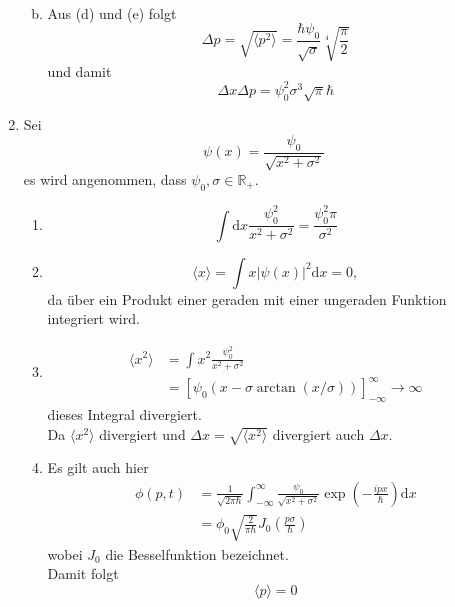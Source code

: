 \begin{enumerate}
\begin{enumerate}[(a)]
\begin{align}
\end{align}
\item Aus (d) und (e) folgt
\begin{equation}
  \Delta p = \sqrt{\langle p^2 \rangle} = \frac{\hbar \psi_0} {\sqrt{\sigma}}\sqrt[4]{\frac{\pi}{2}}
\end{equation}
und damit 
\begin{equation}
  \Delta x \Delta p = \psi_0^2\sigma^3\sqrt{\pi}\hbar
\end{equation}
\end{enumerate}
\item Sei 
\begin{equation}
  \psi(x)=\frac{\psi_0}{\sqrt{x^2+\sigma^2}}
\end{equation}
es wird angenommen, dass $\psi_0,\sigma\in\mathbb{R}_+$.
\begin{enumerate}
\item 
\begin{equation}
  \int \mathrm{d}x \frac{\psi_0^2}{x^2+\sigma^2}=\frac{\psi_0^2 \pi}{\sigma^2}
\end{equation}
\item 
\begin{equation}
  \langle x \rangle = \int x|\psi(x)|^2 \mathrm{d}x=0,
\end{equation}
da über ein Produkt einer geraden mit einer ungeraden Funktion integriert wird.
\item 
\begin{align}
  \langle x^2 \rangle &= \int x^2 \frac{\psi_0^2}{x^2+\sigma^2}\\
  &=[\psi_0(x-\sigma \arctan (x/\sigma))]_{-\infty}^{\infty}\rightarrow \infty
\end{align}
dieses Integral divergiert.\\
Da $\langle x^2 \rangle$ divergiert und $\Delta x = \sqrt{\langle x^2 \rangle}$ divergiert auch $\Delta x$.
\item Es gilt auch hier
\begin{align}
  \phi(p,t)&=\frac{1}{\sqrt{2 \pi \hbar}}\int_{-\infty}^{\infty} \frac{\psi_0}{\sqrt{x^2+\sigma^2}}\exp\left(-\frac{ipx}{\hbar}\right)\mathrm{d}x \\
  &= \phi_0 \sqrt{\frac{2}{\pi \hbar}}J_0\left(\frac{p \sigma}{\hbar}\right)
\end{align}
wobei $J_0$ die Besselfunktion bezeichnet.\\
Damit folgt 
\begin{equation}
  \langle p \rangle = 0
\end{equation}

\end{enumerate}
\end{enumerate}

